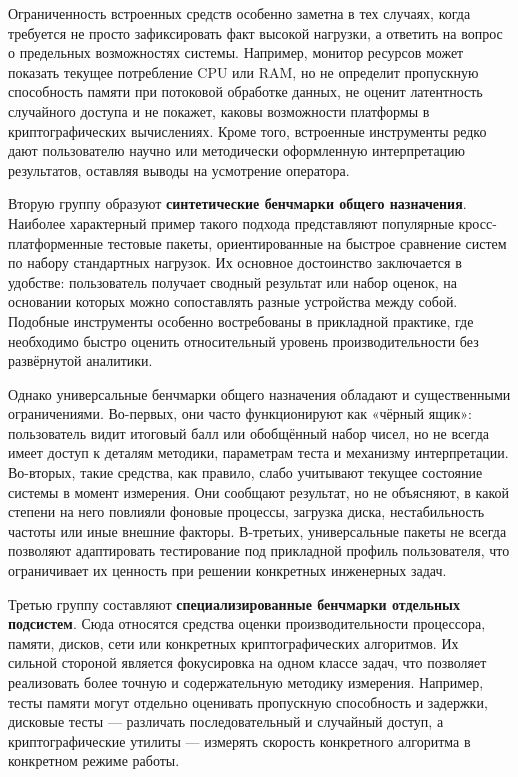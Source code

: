 Ограниченность встроенных средств особенно заметна в тех случаях, когда требуется не просто зафиксировать факт высокой нагрузки, а ответить на вопрос о предельных возможностях системы. Например, монитор ресурсов может показать текущее потребление CPU или RAM, но не определит пропускную способность памяти при потоковой обработке данных, не оценит латентность случайного доступа и не покажет, каковы возможности платформы в криптографических вычислениях. Кроме того, встроенные инструменты редко дают пользователю научно или методически оформленную интерпретацию результатов, оставляя выводы на усмотрение оператора.

Вторую группу образуют \textbf{синтетические бенчмарки общего назначения}. Наиболее характерный пример такого подхода представляют популярные кросс-платформенные тестовые пакеты, ориентированные на быстрое сравнение систем по набору стандартных нагрузок. Их основное достоинство заключается в удобстве: пользователь получает сводный результат или набор оценок, на основании которых можно сопоставлять разные устройства между собой. Подобные инструменты особенно востребованы в прикладной практике, где необходимо быстро оценить относительный уровень производительности без развёрнутой аналитики.

Однако универсальные бенчмарки общего назначения обладают и существенными ограничениями. Во-первых, они часто функционируют как «чёрный ящик»: пользователь видит итоговый балл или обобщённый набор чисел, но не всегда имеет доступ к деталям методики, параметрам теста и механизму интерпретации. Во-вторых, такие средства, как правило, слабо учитывают текущее состояние системы в момент измерения. Они сообщают результат, но не объясняют, в какой степени на него повлияли фоновые процессы, загрузка диска, нестабильность частоты или иные внешние факторы. В-третьих, универсальные пакеты не всегда позволяют адаптировать тестирование под прикладной профиль пользователя, что ограничивает их ценность при решении конкретных инженерных задач.

Третью группу составляют \textbf{специализированные бенчмарки отдельных подсистем}. Сюда относятся средства оценки производительности процессора, памяти, дисков, сети или конкретных криптографических алгоритмов. Их сильной стороной является фокусировка на одном классе задач, что позволяет реализовать более точную и содержательную методику измерения. Например, тесты памяти могут отдельно оценивать пропускную способность и задержки, дисковые тесты --- различать последовательный и случайный доступ, а криптографические утилиты --- измерять скорость конкретного алгоритма в конкретном режиме работы.

